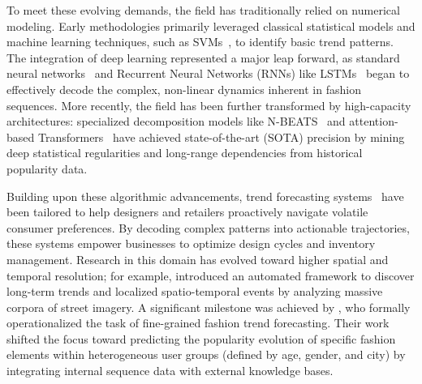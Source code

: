\documentclass[Afour,sageh,times]{sagej}
\begin{document}
{%
To meet these evolving demands, the field has traditionally relied on numerical modeling.
Early methodologies primarily leveraged classical statistical models and machine learning techniques, such as SVMs~\cite{sun2008sales}, to identify basic trend patterns. The integration of deep learning represented a major leap forward, as standard neural networks~\cite{loureiro2018exploring} and Recurrent Neural Networks (RNNs) like LSTMs~\cite{singh2019fashion} began to effectively decode the complex, non-linear dynamics inherent in fashion sequences. More recently, the field has been further transformed by high-capacity architectures: specialized decomposition models like N-BEATS~\cite{oreshkin2019n} and attention-based Transformers~\cite{lim2021temporal} have achieved state-of-the-art (SOTA) precision by mining deep statistical regularities and long-range dependencies from historical popularity data.

Building upon these algorithmic advancements, trend forecasting systems~\cite{xu2021sportswear,ding2023computational, xu2024diffusion} have been tailored to help designers and retailers proactively navigate volatile consumer preferences. By decoding complex patterns into actionable trajectories, these systems empower businesses to optimize design cycles and inventory management. Research in this domain has evolved toward higher spatial and temporal resolution; for example, \citet{mall2019geostyle} introduced an automated framework to discover long-term trends and localized spatio-temporal events by analyzing massive corpora of street imagery. A significant milestone was achieved by \citet{ma2020knowledge}, who formally operationalized the task of fine-grained fashion trend forecasting. Their work shifted the focus toward predicting the popularity evolution of specific fashion elements within heterogeneous user groups (defined by age, gender, and city) by integrating internal sequence data with external knowledge bases.

}
\end{document}

